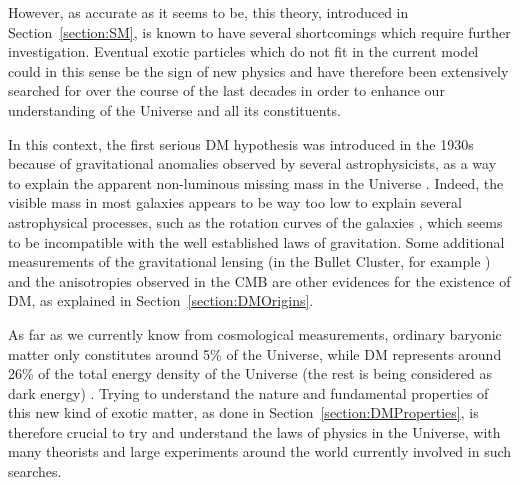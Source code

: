 \documentclass[a4paper, 10pt, openright]{report}
\begin{document}
However, as accurate as it seems to be, this theory, introduced in Section~\ref{section:SM}, is known to have several shortcomings which require further investigation. Eventual exotic particles which do not fit in the current model could in this sense be the sign of new physics and have therefore been extensively searched for over the course of the last decades in order to enhance our understanding of the Universe and all its constituents.

In this context, the first serious \acf{DM} hypothesis was introduced in the 1930s because of gravitational anomalies observed by several astrophysicists, as a way to explain the apparent non-luminous missing mass in the Universe \cite{FirstEvidence}. Indeed, the visible mass in most galaxies appears to be way too low to explain several astrophysical processes, such as the rotation curves of the galaxies \cite{RotationCurves}, which seems to be incompatible with the well established laws of gravitation. Some additional measurements of the gravitational lensing (in the Bullet Cluster, for example \cite{BulletCluster}) and the anisotropies observed in the \acf{CMB} \cite{CMBAnisotropies} are other evidences for the existence of \ac{DM}, as explained in Section~\ref{section:DMOrigins}.

As far as we currently know from cosmological measurements, ordinary baryonic matter only constitutes around 5\% of the Universe, while  \ac{DM} represents around 26\% of the total energy density of the Universe (the rest is being considered as dark energy) \cite{Repartition}. Trying to understand the nature and fundamental properties of this new kind of exotic matter, as done in Section~\ref{section:DMProperties}, is therefore crucial to try and understand the laws of physics in the Universe, with many theorists and large experiments around the world currently involved in such searches. 
\end{document}
